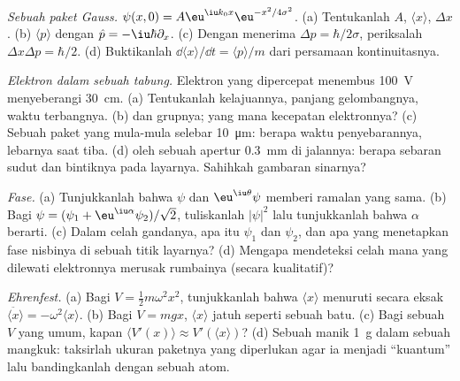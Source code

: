 \begin{exercise}[$\star\star$]\label{exo:b2:schrodinger-wave-functions:6}
\emph{Sebuah paket Gauss.} $\psi(x,0) = A\eu^{\iu k_0x}\eu^{-x^2/4\sigma^2}$. (a)
Tentukanlah $A$, $\langle x\rangle$, $\Delta x$. (b) $\langle p\rangle$ dengan $\hat p =
-\iu\hbar\partial_x$. (c) Dengan menerima $\Delta p = \hbar/2\sigma$, periksalah
$\Delta x\Delta p = \hbar/2$. (d) Buktikanlah $\dd\langle x\rangle/\dd t = \langle
p\rangle/m$ dari persamaan kontinuitasnya.
\end{exercise}

\begin{exercise}[$\star\star$]\label{exo:b2:schrodinger-wave-functions:7}
\emph{Elektron dalam sebuah tabung.} Elektron yang dipercepat menembus \qty{100}{V}
menyeberangi \qty{30}{cm}. (a) Tentukanlah kelajuannya, panjang gelombangnya, waktu terbangnya. (b)  dan
grupnya; yang mana kecepatan elektronnya? (c) Sebuah paket yang mula-mula
selebar \qty{10}{\micro m}: berapa waktu penyebarannya, lebarnya saat tiba. (d) 
oleh sebuah apertur \qty{0.3}{mm} di jalannya: berapa sebaran sudut dan bintiknya pada
layarnya. Sahihkah gambaran sinarnya?
\end{exercise}

\begin{exercise}[$\star\star$]\label{exo:b2:schrodinger-wave-functions:8}
\emph{Fase.} (a) Tunjukkanlah bahwa $\psi$ dan $\eu^{\iu\theta}\psi$ memberi ramalan
yang sama. (b) Bagi $\psi = (\psi_1 + \eu^{\iu\alpha}\psi_2)/\sqrt2$, tuliskanlah
$|\psi|^2$ lalu tunjukkanlah bahwa $\alpha$ berarti. (c) Dalam celah gandanya, apa
itu $\psi_1$ dan $\psi_2$, dan apa yang menetapkan fase nisbinya di sebuah titik
layarnya? (d) Mengapa mendeteksi celah mana yang dilewati elektronnya
merusak rumbainya (secara kualitatif)?
\end{exercise}

\begin{exercise}[$\star\star$]\label{exo:b2:schrodinger-wave-functions:9}
\emph{Ehrenfest.} (a) Bagi $V = \tfrac12m\omega^2x^2$, tunjukkanlah bahwa $\langle
x\rangle$ menuruti secara eksak $\ddot{\langle x\rangle} = -\omega^2\langle x\rangle$.
(b) Bagi $V = mgx$, $\langle x\rangle$ jatuh seperti sebuah batu. (c) Bagi sebuah
$V$ yang umum, kapan $\langle V'(x)\rangle \approx V'(\langle x\rangle)$? (d) Sebuah
manik \qty{1}{g} dalam sebuah mangkuk: taksirlah ukuran paketnya yang diperlukan agar
ia menjadi ``kuantum'' lalu bandingkanlah dengan sebuah atom.
\end{exercise}

